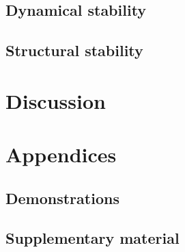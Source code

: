 \documentclass[12pt, titlepage, twoside, openright]{report}
\begin{document}
  \section{Dynamical stability}
  
  \FloatBarrier
  \newpage
  \section{Structural stability}\label{sec : results structural stability}
  
  \FloatBarrier

%  
  \chapter{Discussion}
  
  \FloatBarrier
  \chapter{Appendices}
  \section{Demonstrations}
  
  \FloatBarrier
  \section{Supplementary material}
  
  \FloatBarrier
  \printbibliography
\end{document}

